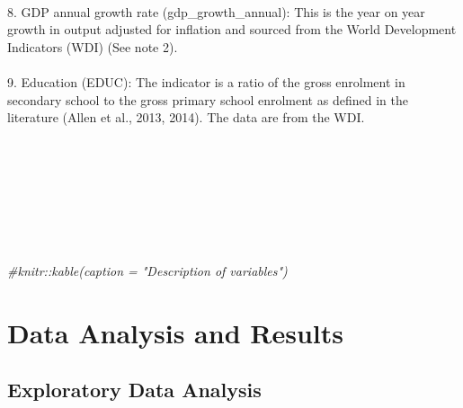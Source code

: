 \documentclass[a4paper,nobind]{templates/ociamthesis}
\newenvironment{Shaded}{\begin{snugshade}}{\end{snugshade}}
\newcommand{\CommentTok}[1]{\textcolor[rgb]{0.56,0.35,0.01}{\textit{#1}}}
\renewenvironment{Shaded}
{
  \vspace{10pt}%
  \begin{snugshade}%
}{%
  \end{snugshade}%
  \vspace{8pt}%
}
\begin{document}
\begin{table}
\begin{tabu}
\\
8. GDP annual growth rate (gdp\_growth\_annual): This is the year on year growth in output adjusted for inflation and sourced from the World Development Indicators (WDI) (See note 2).\\
\addlinespace
\\
9. Education (EDUC): The indicator is a ratio of the gross enrolment in secondary school to the gross primary school enrolment as defined in the literature (Allen et al., 2013, 2014). The data are from the WDI.\\
\\
\bottomrule
{}\\
\\
\\
\\
\\
\\
\end{tabu}
\end{table}

\begin{Shaded}
\begin{Highlighting}[]
  \CommentTok{\#knitr::kable(caption = "Description of variables")}
\end{Highlighting}
\end{Shaded}

\hypertarget{data-analysis-and-results}{%
\chapter{Data Analysis and Results}\label{data-analysis-and-results}}

\hypertarget{exploratory-data-analysis}{%
\section{Exploratory Data Analysis}\label{exploratory-data-analysis}}
\end{document}

